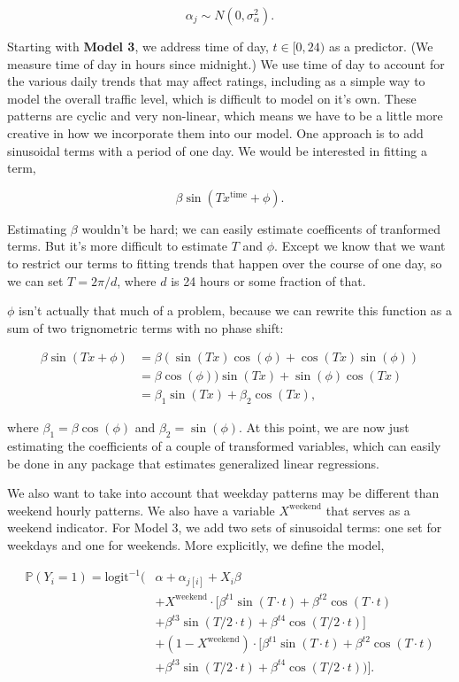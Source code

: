 \documentclass[]{article}
\begin{document}
\[\alpha_j \sim N(0, \sigma^2_\alpha).\]

Starting with \textbf{Model 3}, we address time of day,
\(t \in [0, 24)\) as a predictor. (We measure time of day in hours since
midnight.) We use time of day to account for the various daily trends
that may affect ratings, including as a simple way to model the overall
traffic level, which is difficult to model on it's own. These patterns
are cyclic and very non-linear, which means we have to be a little more
creative in how we incorporate them into our model. One approach is to
add sinusoidal terms with a period of one day. We would be interested in
fitting a term,

\[\beta \sin (T x^{\text{time}} + \phi).\]

Estimating \(\beta\) wouldn't be hard; we can easily estimate
coefficents of tranformed terms. But it's more difficult to estimate
\(T\) and \(\phi\). Except we know that we want to restrict our terms to
fitting trends that happen over the course of one day, so we can set
\(T = 2 \pi / d\), where \(d\) is 24 hours or some fraction of that.

\(\phi\) isn't actually that much of a problem, because we can rewrite
this function as a sum of two trignometric terms with no phase shift:

\begin{align*}
\beta \sin (T x + \phi) &= 
\beta \left( \sin (T x) \cos (\phi) + \cos (T x) \sin (\phi) \right)\\
&= \beta \cos (\phi)) \sin (T x) + \sin (\phi) \cos (T x)\\
&= \beta_1 \sin (T x) + \beta_2 \cos (T x),
\end{align*}

where \(\beta_1 = \beta \cos (\phi)\) and \(\beta_2 = \sin (\phi).\) At
this point, we are now just estimating the coefficients of a couple of
transformed variables, which can easily be done in any package that
estimates generalized linear regressions.

We also want to take into account that weekday patterns may be different
than weekend hourly patterns. We also have a variable
\(X^\text{weekend}\) that serves as a weekend indicator. For Model 3, we
add two sets of sinusoidal terms: one set for weekdays and one for
weekends. More explicitly, we define the model,

\begin{equation}
\begin{split}
\mathbb{P} (Y_i=1) = \text{logit}^{-1} (&\alpha + \alpha_{j[i]} + X_i \beta \\
&+ X^\text{weekend} \cdot [\beta^{t1} \sin(T \cdot t) + \beta^{t2} \cos (T \cdot t)\\
&+ \beta^{t3} \sin(T/2 \cdot t) + \beta^{t4} \cos (T/2 \cdot t)]\\
&+ (1 - X^\text{weekend}) \cdot [\beta^{t1} \sin(T \cdot t) + \beta^{t2} \cos (T \cdot t)\\
&+ \beta^{t3} \sin(T/2 \cdot t) + \beta^{t4} \cos (T/2 \cdot t))].
\end{split}
\end{equation}
\end{document}
